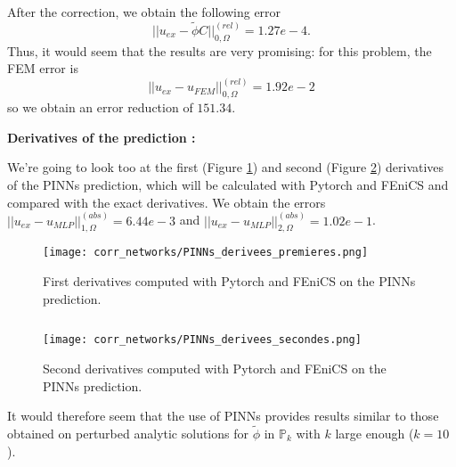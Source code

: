 After the correction, we obtain the following error 
\begin{equation*}
	||u_{ex}-\tilde{\phi}C||_{0,\Omega}^{(rel)}=1.27e-4.
\end{equation*}
Thus, it would seem that the results are very promising: for this problem, the FEM error is 
\begin{equation*}
	||u_{ex}-u_{FEM}||_{0,\Omega}^{(rel)}=1.92e-2
\end{equation*}
so we obtain an error reduction of $151.34$.

\textbf{Derivatives of the prediction :}

We're going to look too at the first (Figure \ref{corr_networks_PINNs_derivees_premieres}) and second (Figure \ref{corr_networks_PINNs_derivees_secondes}) derivatives of the PINNs prediction, which will be calculated with Pytorch and FEniCS and compared with the exact derivatives. We obtain the errors $||u_{ex}-u_{MLP}||_{1,\Omega}^{(abs)}=6.44e-3$ and $||u_{ex}-u_{MLP}||_{2,\Omega}^{(abs)}=1.02e-1$.

\begin{minipage}{0.48\linewidth}
	\begin{figure}[H]
		\centering
		\texttt{[image: corr\_networks/PINNs\_derivees\_premieres.png]}
		\caption{First derivatives computed with Pytorch and FEniCS on the PINNs prediction.}
		\label{corr_networks_PINNs_derivees_premieres}
	\end{figure} 
\end{minipage} $\qquad$
\begin{minipage}{0.48\linewidth}
	\begin{figure}[H]
		\centering
		\texttt{[image: corr\_networks/PINNs\_derivees\_secondes.png]}
		\caption{Second derivatives computed with Pytorch and FEniCS on the PINNs prediction.}
		\label{corr_networks_PINNs_derivees_secondes}
	\end{figure} 
\end{minipage}

It would therefore seem that the use of PINNs provides results similar to those obtained on perturbed analytic solutions for $\tilde{\phi}$ in $\mathbb{P}_k$ with $k$ large enough ($k=10$).